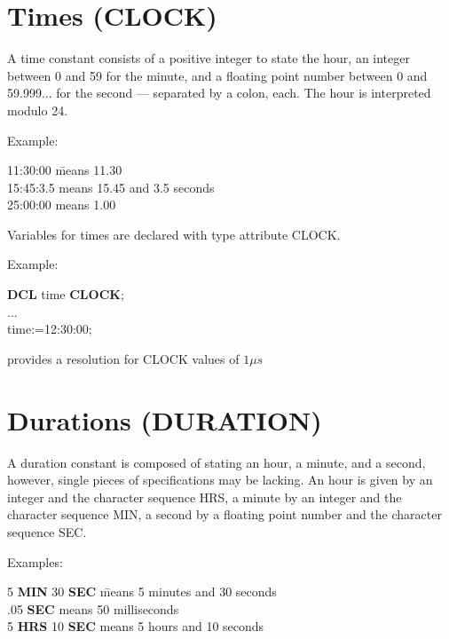 \section{Times (CLOCK)}   %
\label{sec_type_clock}

A time constant consists of a positive integer to state the hour, an
integer between 0 and 59 for the minute, and a floating point number
between 0 and 59.999... for the second --- separated by a colon, each.
The hour is interpreted modulo 24.

Example:

\begin{tabbing}
11:30:00 \x \= means 11.30\\
15:45:3.5   \> means 15.45 and 3.5 seconds\\
25:00:00    \> means 1.00
\end{tabbing}

Variables for times are declared with type attribute CLOCK.



Example:

{\bf DCL} time {\bf CLOCK};\\
...\\
time:=12:30:00;

\OpenPEARL{} provides a resolution for CLOCK values of $1\mu s$

\section{Durations (DURATION)}   %
\label{sec_type_duration}

A duration constant is composed of stating an hour, a minute, and a
second, however, single pieces of specifications may be lacking. An hour
is given by an integer and the character sequence HRS, a minute by an
integer and the character sequence MIN, a second by a floating point
number and the character sequence SEC.

Examples:

\begin{tabbing}
5 {\bf MIN} 30 {\bf SEC} \= means 5 minutes and 30 seconds \\
.05 {\bf SEC}            \> means 50 milliseconds \\
5 {\bf HRS} 10 {\bf SEC} \> means 5 hours and 10 seconds
\end{tabbing}

